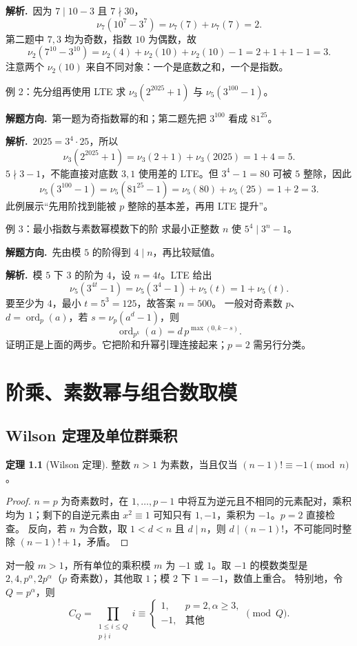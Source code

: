 \documentclass[UTF8,a4paper,11pt,oneside,openany,fontset=fandol]{ctexbook}
\theoremstyle{definition}
\newtheorem{theorem}[definition]{定理}
\newcommand{\ord}{\operatorname{ord}}
\newcommand{\sol}{\par\noindent\textbf{解析.}\ }
\newcommand{\hint}{\par\noindent\textbf{解题方向.}\ }
\begin{document}
\sol 因为 $7\mid10-3$ 且 $7\nmid30$，
\[
 \nu_7(10^7-3^7)=\nu_7(7)+\nu_7(7)=2.
\]
第二题中 $7,3$ 均为奇数，指数 $10$ 为偶数，故
\[
 \nu_2(7^{10}-3^{10})=\nu_2(4)+\nu_2(10)+\nu_2(10)-1=2+1+1-1=3.
\]
注意两个 $\nu_2(10)$ 来自不同对象：一个是底数之和，一个是指数。


\begin{problem}{例 2：先分组再使用 LTE}
求 $\nu_3(2^{2025}+1)$ 与 $\nu_5(3^{100}-1)$。
\end{problem}
\hint 第一题为奇指数幂的和；第二题先把 $3^{100}$ 看成 $81^{25}$。

\sol $2025=3^4\cdot25$，所以
\[
\nu_3(2^{2025}+1)=\nu_3(2+1)+\nu_3(2025)=1+4=5.
\]
$5\nmid3-1$，不能直接对底数 $3,1$ 使用差的 LTE。但 $3^4-1=80$ 可被 $5$ 整除，因此
\[
\nu_5(3^{100}-1)=\nu_5(81^{25}-1)=\nu_5(80)+\nu_5(25)=1+2=3.
\]
此例展示“先用阶找到能被 $p$ 整除的基本差，再用 LTE 提升”。


\begin{problem}{例 3：最小指数与素数幂模数下的阶}
求最小正整数 $n$ 使 $5^4\mid3^n-1$。
\end{problem}
\hint 先由模 $5$ 的阶得到 $4\mid n$，再比较赋值。

\sol 模 $5$ 下 $3$ 的阶为 $4$，设 $n=4t$。LTE 给出
\[
 \nu_5(3^{4t}-1)=\nu_5(3^4-1)+\nu_5(t)=1+\nu_5(t).
\]
要至少为 $4$，最小 $t=5^3=125$，故答案 $n=500$。
一般对奇素数 $p$、$d=\ord_p(a)$，若 $s=\nu_p(a^d-1)$，则
\[
 \ord_{p^k}(a)=d\,p^{\max(0,k-s)}.
\]
证明正是上面的两步。它把阶和升幂引理连接起来；$p=2$ 需另行分类。



\chapter{阶乘、素数幂与组合数取模}
\section{Wilson 定理及单位群乘积}
\begin{theorem}[Wilson 定理]
整数 $n>1$ 为素数，当且仅当 $(n-1)!\equiv-1\pmod n$。
\end{theorem}
\begin{proof}
$n=p$ 为奇素数时，在 $1,\ldots,p-1$ 中将互为逆元且不相同的元素配对，乘积均为 $1$；剩下的自逆元素由 $x^2\equiv1$ 可知只有 $1,-1$，乘积为 $-1$。$p=2$ 直接检查。
反向，若 $n$ 为合数，取 $1<d<n$ 且 $d\mid n$，则 $d\mid(n-1)!$，不可能同时整除 $(n-1)!+1$，矛盾。
\end{proof}
对一般 $m>1$，所有单位的乘积模 $m$ 为 $-1$ 或 $1$。取 $-1$ 的模数类型是 $2,4,p^\alpha,2p^\alpha$（$p$ 奇素数），其他取 $1$；模 $2$ 下 $1=-1$，数值上重合。
特别地，令 $Q=p^\alpha$，则
\[
 C_Q=\prod_{\substack{1\le i\le Q\\p\nmid i}}i\equiv
 \begin{cases}1,&p=2,\alpha\ge3,\\-1,&\text{其他}\end{cases}\pmod Q.
\]
\end{document}
